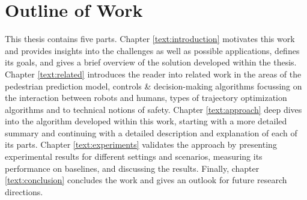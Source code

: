 \section{Outline of Work}
\label{text:introduction/outline}
This thesis contains five parts. Chapter \ref{text:introduction} motivates this work and provides insights into the challenges as well as possible applications, defines its goals, and gives a brief overview of the solution developed within the thesis. Chapter \ref{text:related} introduces the reader into related work in the areas of the pedestrian prediction model, controls \& decision-making algorithms focussing on the interaction between robots and humans, types of trajectory optimization algorithms and to technical notions of safety. Chapter \ref{text:approach} deep dives into the algorithm developed within this work, starting with a more detailed summary and continuing with a detailed description and explanation of each of its parts. Chapter \ref{text:experiments} validates the approach by presenting experimental results for different settings and scenarios, measuring its performance on baselines, and discussing the results. Finally, chapter \ref{text:conclusion} concludes the work and gives an outlook for future research directions.
